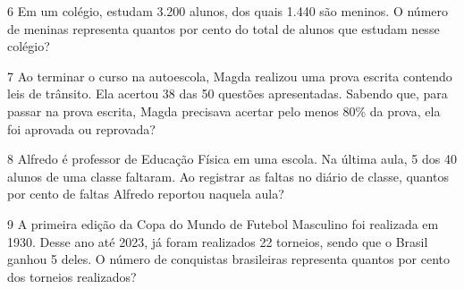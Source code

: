 


\pagebreak

\num{6} Em um colégio, estudam 3.200 alunos, dos quais 1.440 são meninos. O
número de meninas representa quantos por cento do total de alunos que estudam
nesse colégio?

\bigskip



\bigskip

\num{7} Ao terminar o curso na autoescola, Magda realizou uma prova escrita
contendo leis de trânsito. Ela acertou 38 das 50 questões apresentadas.
Sabendo que, para passar na prova escrita, Magda precisava acertar pelo
menos 80\% da prova, ela foi aprovada ou reprovada?

\bigskip



\bigskip

\num{8} Alfredo é professor de Educação Física em uma escola. Na última aula,
5 dos 40 alunos de uma classe faltaram. Ao registrar as faltas no diário
de classe, quantos por cento de faltas Alfredo reportou naquela aula?

\bigskip



\bigskip

\num{9} A primeira edição da Copa do Mundo de Futebol Masculino foi realizada
em 1930. Desse ano até 2023, já foram realizados 22 torneios, sendo que
o Brasil ganhou 5 deles. O número de conquistas brasileiras representa
quantos por cento dos torneios realizados?




